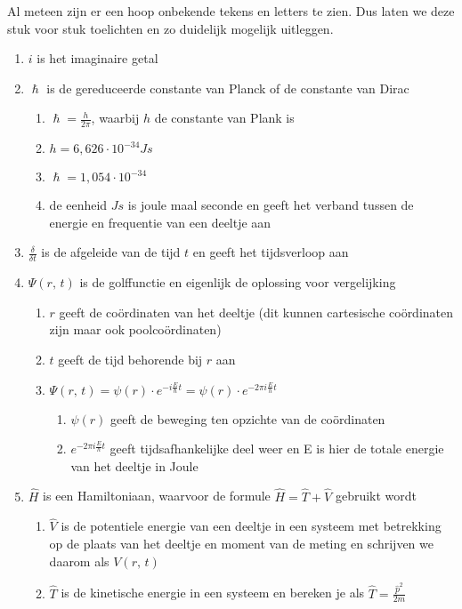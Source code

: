 \documentclass[11pt,fleqn]{book} %
\begin{document}
Al meteen zijn er een hoop onbekende tekens en letters te zien. Dus laten we deze stuk voor stuk toelichten en zo duidelijk mogelijk uitleggen.
\begin{enumerate}
\item $i$ is het imaginaire getal
\item $\hslash$ is de gereduceerde constante van Planck of de constante van Dirac
\begin{enumerate}
\item $\hslash = \frac{h}{2\pi}$, waarbij $h$ de constante van Plank is
\item $h = 6,626 \cdot 10^{-34} Js$
\item $\hslash = 1,054 \cdot 10^{-34}$
\item de eenheid $Js$ is joule maal seconde en geeft het verband tussen de energie en frequentie van een deeltje aan
\end{enumerate}
\item $\frac{\delta}{\delta t}$ is de afgeleide van de tijd $t$ en geeft het tijdsverloop aan
\item $\Psi(r,\,t)$ is de golffunctie en eigenlijk de oplossing voor vergelijking
\begin{enumerate}
\item $r$ geeft de coördinaten van het deeltje (dit kunnen cartesische coördinaten zijn maar ook poolcoördinaten)
\item $t$ geeft de tijd behorende bij $r$ aan
\item $\Psi(r,\,t)=\psi(r)\cdot e^{-i\frac{E}{\hslash}t}=\psi(r)\cdot e^{-2\pi i\frac{E}{h}t}$
\begin{enumerate}
\item $\psi(r)$ geeft de beweging ten opzichte van de coördinaten
\item $e^{-2\pi i\frac{E}{h}t}$ geeft tijdsafhankelijke deel weer en E is hier de totale energie van het deeltje in Joule
\end{enumerate}
\end{enumerate}
\item $\hat{H}$ is een Hamiltoniaan, waarvoor de formule $\hat{H}=\hat{T}+\hat{V}$ gebruikt wordt
\begin{enumerate}
\item $\hat{V}$ is de potentiele energie van een deeltje in een systeem met betrekking op de plaats van het deeltje en moment van de meting en schrijven we daarom als $V(r,\,t)$
\item $\hat{T}$ is de kinetische energie in een systeem en bereken je als $\hat{T} = \frac{\hat{p}^2}{2m}$

\end{enumerate}
\end{enumerate}
\end{document}
